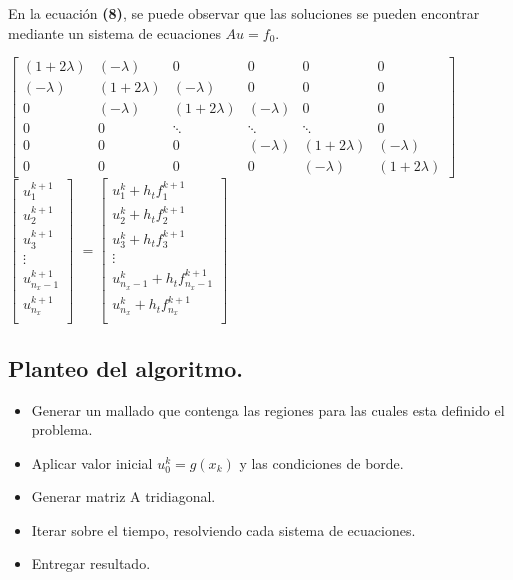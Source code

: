 \documentclass[12pt,letterpaper]{article}
\begin{document}
En la ecuación \textbf{(8)}, se puede observar que las soluciones se pueden encontrar mediante un sistema de ecuaciones $Au=f_0$.\\
\begin{center}
$
\begin{bmatrix}
(1+2\lambda) & (-\lambda) & 0 & 0 & 0 & 0 \\
(-\lambda) & (1+2\lambda) & (-\lambda) & 0 & 0 & 0 \\
0 & (-\lambda) & (1+2\lambda) & (-\lambda) & 0 & 0 \\
0 & 0 & \ddots & \ddots & \ddots & 0 \\
0 & 0 & 0 & (-\lambda) & (1+2\lambda) & (-\lambda)\\
0 & 0 &0&0&(-\lambda) & (1+2\lambda)
\end{bmatrix}
$
$
\begin{bmatrix}
u_1^{k+1} \\
u_2^{k+1} \\
u_3^{k+1} \\
\vdots \\
u_{n_x-1}^{k+1} \\
u_{n_x}^{k+1} \\
\end{bmatrix}
$
$=
\begin{bmatrix}
u_1^k + h_tf_1^{k+1} \\
u_2^k + h_tf_2^{k+1} \\
u_3^k + h_tf_3^{k+1} \\
\vdots \\
u_{n_x-1}^k + h_tf_{n_x-1}^{k+1} \\
u_{n_x}^k + h_tf_{n_x}^{k+1} \\
\end{bmatrix}
$
\end{center}

\subsection{Planteo del algoritmo.}
\begin{itemize}
	\item Generar un mallado que contenga las regiones para las cuales esta definido el problema.
	\item Aplicar valor inicial $u_0^k=g(x_k)$ y las condiciones de borde.
	\item Generar matriz A tridiagonal.
	\item Iterar sobre el tiempo, resolviendo cada sistema de ecuaciones.
	\item Entregar resultado.
\end{itemize}
\newpage
\end{document}
